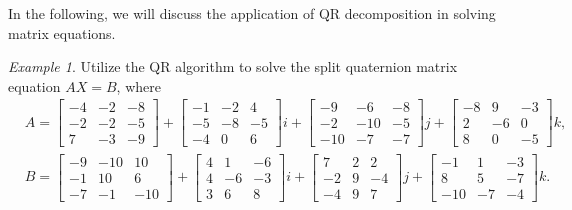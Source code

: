\documentclass{book}
\theoremstyle{remark}
\newtheorem{example}{\it\indent Example}[section]
\begin{document}
\begin{multicols}{2}
In the following, we will discuss the application of QR decomposition in solving matrix equations.
\begin{example}
Utilize the QR algorithm to solve the split quaternion matrix equation $AX = B$, where
\begin{align*}
  & A =
    \begin{bmatrix}
    -4 & -2 & -8 \\
    -2 & -2 & -5 \\
     7 & -3 & -9
    \end{bmatrix} +
    \begin{bmatrix}
    -1 & -2 &  4 \\
    -5 & -8 & -5 \\
    -4 &  0 &  6
    \end{bmatrix} i 
    + 
    \begin{bmatrix}
    -9  & -6  & -8 \\
    -2  & -10 & -5 \\
    -10 & -7  & -7
    \end{bmatrix} j +
    \begin{bmatrix}
    -8 &  9 & -3 \\
     2 & -6 &  0 \\
     8 &  0 & -5
    \end{bmatrix} k,\\
  & B =
    \begin{bmatrix}
    -9 & -10 &  10 \\
    -1 &  10 &  6 \\
    -7 & -1  & -10
    \end{bmatrix} +
    \begin{bmatrix}
    4 &  1 & -6 \\
    4 & -6 & -3 \\
    3 &  6 &  8
    \end{bmatrix} i 
    +
    \begin{bmatrix}
     7 & 2 &  2 \\
    -2 & 9 & -4 \\
    -4 & 9 &  7
    \end{bmatrix} j +
    \begin{bmatrix}
    -1 &   1 & -3 \\
     8 &   5 & -7 \\
    -10 & -7 & -4
    \end{bmatrix} k.
\end{align*}
\end{example}  


\end{multicols}
\end{document}
